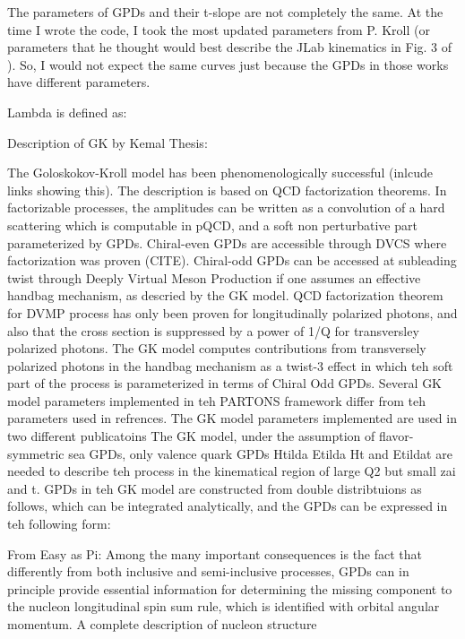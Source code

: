 The parameters of GPDs and their t-slope are not completely the same. At the time I wrote the code, I took the most updated parameters from P. Kroll (or parameters that he thought would best describe the JLab kinematics in Fig. 3 of \cite{Diehl2020ExtractionKinematics} ). So, I would not expect the same curves just because the GPDs in those works have different parameters. 

Lambda is defined as: %

Description of GK by Kemal Thesis:

The Goloskokov-Kroll model has been phenomenologically successful (inlcude links showing this).  The description is based on QCD factorization theorems. In factorizable processes, the amplitudes can be written as a convolution of a hard scattering which is computable in pQCD, and a soft non perturbative part parameterized by GPDs. Chiral-even GPDs are accessible through DVCS where factorization was proven (CITE). Chiral-odd GPDs can be accessed at subleading twist through Deeply Virtual Meson Production if one assumes an effective handbag mechanism, as descried by the GK model. 
QCD factorization theorem for DVMP process has only been proven for longitudinally polarized photons, and also that the cross section is suppressed by a power of 1/Q for transversley polarized photons. 
The GK model computes contributions from transversely polarized photons in the handbag mechanism as a twist-3 effect in which teh soft part of the process is parameterized in terms of Chiral Odd GPDs.
Several GK model parameters implemented in teh PARTONS framework differ from teh parameters used in refrences. The GK model parameters implemented are used in two different publicatoins
The GK model, under the assumption of flavor-symmetric sea GPDs, only valence quark GPDs Htilda Etilda Ht and Etildat are needed to describe teh process in the kinematical region of large Q2 but small zai and t. GPDs in teh GK model are constructed from double distribtuions as follows, which can be integrated analytically, and the GPDs can be expressed in teh following form:


From Easy as Pi:
Among the many important consequences is the fact that differently from both inclusive and semi-inclusive processes, GPDs can in principle provide essential information
for determining the missing component to the nucleon longitudinal spin sum rule, which
is identified with orbital angular momentum. A complete description of nucleon structure


